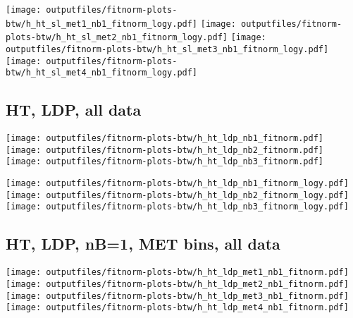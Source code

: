 \documentclass[11pt]{article}
\begin{document}
    \noindent
     \texttt{[image: outputfiles/fitnorm-plots-btw/h\_ht\_sl\_met1\_nb1\_fitnorm\_logy.pdf]}
     \texttt{[image: outputfiles/fitnorm-plots-btw/h\_ht\_sl\_met2\_nb1\_fitnorm\_logy.pdf]}
     \texttt{[image: outputfiles/fitnorm-plots-btw/h\_ht\_sl\_met3\_nb1\_fitnorm\_logy.pdf]}
     \texttt{[image: outputfiles/fitnorm-plots-btw/h\_ht\_sl\_met4\_nb1\_fitnorm\_logy.pdf]}

   \clearpage














    \subsection{ HT, LDP, all data}

    \noindent
     \texttt{[image: outputfiles/fitnorm-plots-btw/h\_ht\_ldp\_nb1\_fitnorm.pdf]}
     \texttt{[image: outputfiles/fitnorm-plots-btw/h\_ht\_ldp\_nb2\_fitnorm.pdf]}
     \texttt{[image: outputfiles/fitnorm-plots-btw/h\_ht\_ldp\_nb3\_fitnorm.pdf]}

    \noindent
     \texttt{[image: outputfiles/fitnorm-plots-btw/h\_ht\_ldp\_nb1\_fitnorm\_logy.pdf]}
     \texttt{[image: outputfiles/fitnorm-plots-btw/h\_ht\_ldp\_nb2\_fitnorm\_logy.pdf]}
     \texttt{[image: outputfiles/fitnorm-plots-btw/h\_ht\_ldp\_nb3\_fitnorm\_logy.pdf]}

     \subsection{ HT, LDP, nB=1, MET bins, all data}

    \noindent
     \texttt{[image: outputfiles/fitnorm-plots-btw/h\_ht\_ldp\_met1\_nb1\_fitnorm.pdf]}
     \texttt{[image: outputfiles/fitnorm-plots-btw/h\_ht\_ldp\_met2\_nb1\_fitnorm.pdf]}
     \texttt{[image: outputfiles/fitnorm-plots-btw/h\_ht\_ldp\_met3\_nb1\_fitnorm.pdf]}
     \texttt{[image: outputfiles/fitnorm-plots-btw/h\_ht\_ldp\_met4\_nb1\_fitnorm.pdf]}
\end{document}
